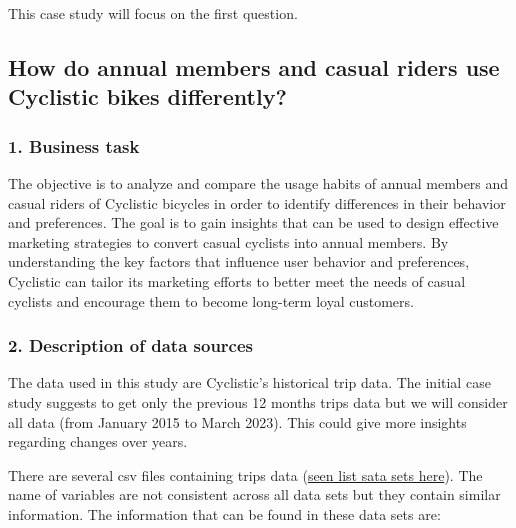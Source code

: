 \documentclass[
]{article}
\begin{document}
This case study will focus on the first question.

\hypertarget{how-do-annual-members-and-casual-riders-use-cyclistic-bikes-differently}{%
\subsection{How do annual members and casual riders use Cyclistic bikes
differently?}\label{how-do-annual-members-and-casual-riders-use-cyclistic-bikes-differently}}

\hypertarget{business-task}{%
\subsubsection{1. Business task}\label{business-task}}

The objective is to analyze and compare the usage habits of annual
members and casual riders of Cyclistic bicycles in order to identify
differences in their behavior and preferences. The goal is to gain
insights that can be used to design effective marketing strategies to
convert casual cyclists into annual members. By understanding the key
factors that influence user behavior and preferences, Cyclistic can
tailor its marketing efforts to better meet the needs of casual cyclists
and encourage them to become long-term loyal customers.

\hypertarget{description-of-data-sources}{%
\subsubsection{2. Description of data
sources}\label{description-of-data-sources}}

The data used in this study are Cyclistic's historical trip data. The
initial case study suggests to get only the previous 12 months trips
data but we will consider all data (from January 2015 to March 2023).
This could give more insights regarding changes over years.

There are several csv files containing trips data
(\href{https://divvy-tripdata.s3.amazonaws.com/index.html}{seen list
sata sets here}). The name of variables are not consistent across all
data sets but they contain similar information. The information that can
be found in these data sets are:
\end{document}

